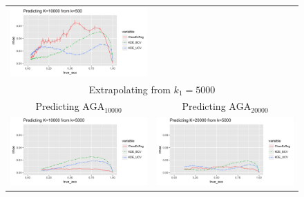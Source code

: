 \documentclass[twoside,11pt]{article}
\newenvironment{myfont}{\fontfamily{phv}\selectfont}{\par}
\begin{document}
\begin{figure}[p]
\begin{tabular}{cc}
\includegraphics[scale = 0.5, clip = true, trim = 0 0 0 0.45in]{sim_large7_K10_k0_5.png}\\
\multicolumn{2}{c}{\begin{myfont}Extrapolating from $k_1 = 5000$\end{myfont}}\\
\begin{myfont}Predicting $\text{AGA}_{10000}$\end{myfont} &
\begin{myfont}Predicting $\text{AGA}_{20000}$\end{myfont}\\
\includegraphics[scale = 0.5, clip = true, trim = 0 0 1.25in 0.45in]{sim_large7_K10_k5.png} &
\includegraphics[scale = 0.5, clip = true, trim = 0 0 0 0.45in]{sim_large7_K20_k5.png}\\

\end{tabular}
\end{figure}
\end{document}
